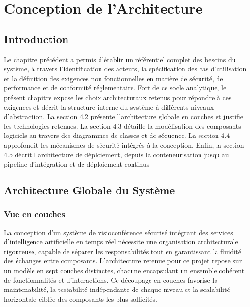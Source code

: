\chapter{Conception de l'Architecture}

\section*{Introduction}
Le chapitre précédent a permis d'établir un référentiel complet des besoins du système, à travers l'identification des acteurs, la spécification des cas d'utilisation et la définition des exigences non fonctionnelles en matière de sécurité, de performance et de conformité réglementaire. Fort de ce socle analytique, le présent chapitre expose les choix architecturaux retenus pour répondre à ces exigences et décrit la structure interne du système à différents niveaux d'abstraction. La section 4.2 présente l'architecture globale en couches et justifie les technologies retenues. La section 4.3 détaille la modélisation des composants logiciels au travers des diagrammes de classes et de séquence. La section 4.4 approfondit les mécanismes de sécurité intégrés à la conception. Enfin, la section 4.5 décrit l'architecture de déploiement, depuis la conteneurisation jusqu'au pipeline d'intégration et de déploiement continus.

\section{Architecture Globale du Système}

\subsection{Vue en couches}
La conception d'un système de visioconférence sécurisé intégrant des services d'intelligence artificielle en temps réel nécessite une organisation architecturale rigoureuse, capable de séparer les responsabilités tout en garantissant la fluidité des échanges entre composants. L'architecture retenue pour ce projet repose sur un modèle en sept couches distinctes, chacune encapsulant un ensemble cohérent de fonctionnalités et d'interactions. Ce découpage en couches favorise la maintenabilité, la testabilité indépendante de chaque niveau et la scalabilité horizontale ciblée des composants les plus sollicités.

